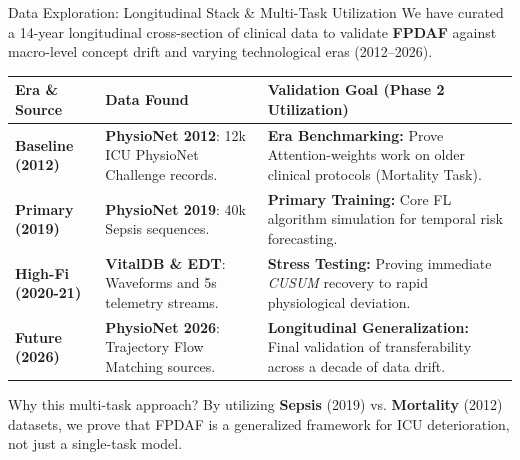 \documentclass[aspectratio=169, 11pt]{beamer}
\begin{document}
\begin{frame}{Data Exploration: Longitudinal Stack \& Multi-Task Utilization}
    \small
    We have curated a 14-year longitudinal cross-section of clinical data to validate \textbf{FPDAF} against macro-level concept drift and varying technological eras (2012--2026).
    
    \vspace{0.2cm}
    \renewcommand{\arraystretch}{1.1}
    \begin{tabular}{|p{3.2cm}|p{4.3cm}|p{5.5cm}|}
        \hline
        \textbf{Era \& Source} & \textbf{Data Found} & \textbf{Validation Goal (Phase 2 Utilization)} \\
        \hline
        \textbf{Baseline (2012)} & \textbf{PhysioNet 2012}: 12k ICU PhysioNet Challenge records. & \textbf{Era Benchmarking:} Prove Attention-weights work on older clinical protocols (Mortality Task). \\
        \hline
        \textbf{Primary (2019)} & \textbf{PhysioNet 2019}: 40k Sepsis sequences. & \textbf{Primary Training:} Core FL algorithm simulation for temporal risk forecasting. \\
        \hline
        \textbf{High-Fi (2020-21)} & \textbf{VitalDB \& EDT}: Waveforms and 5s telemetry streams. & \textbf{Stress Testing:} Proving immediate \textit{CUSUM} recovery to rapid physiological deviation. \\
        \hline
        \textbf{Future (2026)} & \textbf{PhysioNet 2026}: Trajectory Flow Matching sources. & \textbf{Longitudinal Generalization:} Final validation of transferability across a decade of data drift. \\
        \hline
    \end{tabular}

    \vspace{0.3cm}
    \begin{block}{Why this multi-task approach?}
        By utilizing \textbf{Sepsis} (2019) vs. \textbf{Mortality} (2012) datasets, we prove that FPDAF is a generalized framework for ICU deterioration, not just a single-task model.
    \end{block}
\end{frame}
\end{document}
